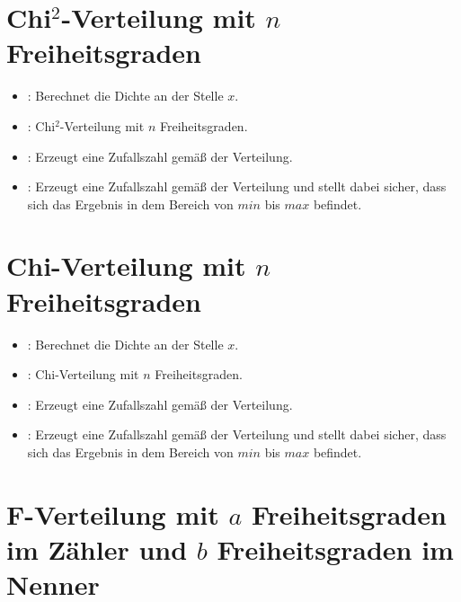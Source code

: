 \section{\texorpdfstring{Chi$^2$}{Chi2}-Verteilung mit \texorpdfstring{$n$}{n} Freiheitsgraden}

\begin{itemize}

\item
{}:
Berechnet die Dichte an der Stelle $x$.

\item
{}:
Chi$^2$-Verteilung mit $n$ Freiheitsgraden.

\item
{}:
Erzeugt eine Zufallszahl gemäß der Verteilung.

\item
{}:
Erzeugt eine Zufallszahl gemäß der Verteilung und stellt dabei sicher, dass sich das Ergebnis in dem Bereich von $min$ bis $max$ befindet.

\end{itemize}



\section{Chi-Verteilung mit \texorpdfstring{$n$}{n} Freiheitsgraden}

\begin{itemize}

\item
{}:
Berechnet die Dichte an der Stelle $x$.

\item
{}:
Chi-Verteilung mit $n$ Freiheitsgraden.

\item
{}:
Erzeugt eine Zufallszahl gemäß der Verteilung.

\item
{}:
Erzeugt eine Zufallszahl gemäß der Verteilung und stellt dabei sicher, dass sich das Ergebnis in dem Bereich von $min$ bis $max$ befindet.

\end{itemize}



\section{F-Verteilung mit \texorpdfstring{$a$}{a} Freiheitsgraden im Zähler und \texorpdfstring{$b$}{b} Freiheitsgraden im Nenner}

